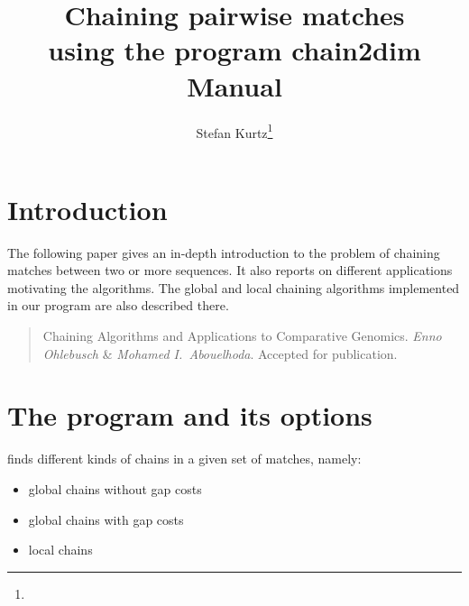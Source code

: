 \documentclass[12pt]{article}
\author{Stefan Kurtz\thanks{\SKaffiliation}}
\title{\textbf{Chaining pairwise matches}\\
       \textbf{using the program chain2dim}\\[2mm]
       \textbf{Manual}}
\begin{document}
\maketitle
\section{Introduction}
The following paper gives an in-depth introduction to the
problem of chaining matches between two or more sequences.  It
also reports on different applications motivating the algorithms.
The global and local chaining algorithms implemented in our program
\CH are also described there.

\begin{quote}
Chaining Algorithms and Applications to Comparative Genomics.
\emph{Enno Ohlebusch} \& \emph{Mohamed I.\ Abouelhoda}. Accepted for
publication.
\end{quote}

\section{The program \CH and its options}

\CH finds different kinds of chains in a given set of matches,
namely:
\begin{itemize}
\item
global chains without gap costs
\item
global chains with gap costs
\item
local chains 
\end{itemize}
\end{document}
